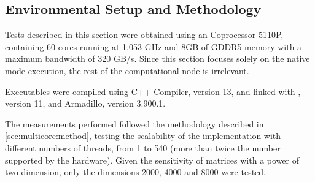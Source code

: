 \documentclass[../thesis]{subfiles}
\begin{document}
	\subsection{Environmental Setup and Methodology}
	\label{subsec:mic:native:results}

	Tests described in this section were obtained using an \intel\xeonphi Coprocessor 5110P, containing 60 cores running at 1.053 GHz and 8GB of GDDR5 memory with a maximum bandwidth of 320 GB/s. Since this section focuses solely on the native mode execution, the rest of the computational node is irrelevant.

	Executables were compiled using \intel C++ Compiler, version 13, and linked with \mkl, version 11, and Armadillo, version 3.900.1.

	The measurements performed followed the methodology described in \cref{sec:multicore:method}, testing the scalability of the implementation with different numbers of threads, from 1 to 540 (more than twice the number supported by the hardware). Given the sensitivity of matrices with a power of two dimension, only the dimensions 2000, 4000 and 8000 were tested.
\end{document}
